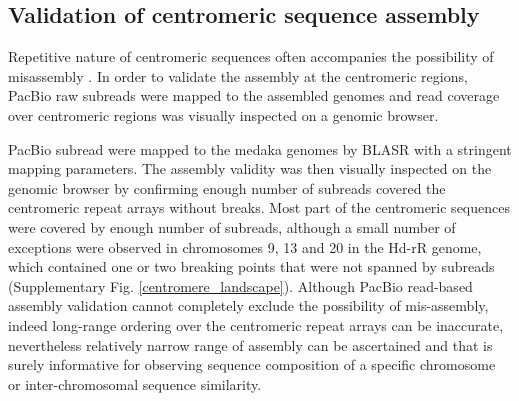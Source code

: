 

\subsection*{Validation of centromeric sequence assembly}
  Repetitive nature of centromeric sequences often accompanies the possibility of misassembly \cite{}. In order to validate the assembly at the centromeric regions, PacBio raw subreads were mapped to the assembled genomes and read coverage over centromeric regions was visually inspected on a genomic browser.


  PacBio subread were mapped to the medaka genomes by BLASR \cite{} with a stringent mapping parameters. The assembly validity was then visually inspected on the genomic browser by confirming enough number of subreads covered the centromeric repeat arrays without breaks. Most part of the centromeric sequences were covered by enough number of subreads, although a small number of exceptions were observed in chromosomes 9, 13 and 20 in the Hd-rR genome, which contained one or two breaking points that were not spanned by subreads (Supplementary Fig. \ref{centromere_landscape}). Although PacBio read-based assembly validation cannot completely exclude the possibility of mis-assembly, indeed long-range ordering over the centromeric repeat arrays can be inaccurate, nevertheless relatively narrow range of assembly can be ascertained and that is surely informative for observing sequence composition of a specific chromosome or inter-chromosomal sequence similarity.


